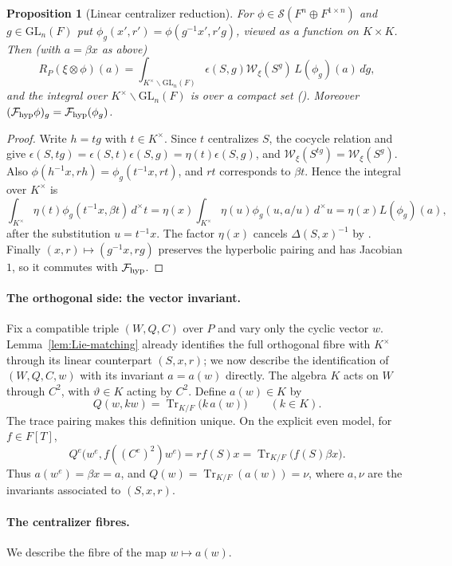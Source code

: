 \documentclass[11pt,oneside,notitlepage]{book}
\numberwithin{equation}{section}
\theoremstyle{plain}
\newtheorem{proposition}[theorem]{Proposition}
\theoremstyle{definition}
\newcommand{\GL}{\mathrm{GL}}
\newcommand{\cS}{\mathcal{S}}
\newcommand{\cW}{\mathcal{W}}
\newcommand{\Tr}{\operatorname{Tr}}
\begin{document}
\begin{proposition}[Linear centralizer reduction]\label{prop:even-lin}
For $\phi\in\cS(F^n\oplus F^{1\times n})$ and $g\in\GL_n(F)$ put $\phi_g(x',r')=\phi(g^{-1}x',r'g)$, viewed as a function on $K\times K$. Then (with $a=\beta x$ as above)
\[R_P(\xi\otimes\phi)(a)=\int_{K^\times\backslash\GL_n(F)}\epsilon(S,g)\cW_\xi(S^g)\,L(\phi_g)(a)\,d\dot g,\]
and the integral over $K^\times\backslash\GL_n(F)$ is over a compact set (). Moreover $(\mathcal F_{\rm hyp}\phi)_g=\mathcal F_{\rm hyp}(\phi_g)$.
\end{proposition}
\begin{proof}
Write $h=tg$ with $t\in K^\times$. Since $t$ centralizes $S$, the cocycle relation and  give $\epsilon(S,tg)=\epsilon(S,t)\epsilon(S,g)=\eta(t)\epsilon(S,g)$, and $\cW_\xi(S^{tg})=\cW_\xi(S^g)$. Also $\phi(h^{-1}x,rh)=\phi_g(t^{-1}x,rt)$, and $rt$ corresponds to $\beta t$. Hence the integral over $K^\times$ is
\[\int_{K^\times}\eta(t)\phi_g(t^{-1}x,\beta t)\,d^\times t=\eta(x)\int_{K^\times}\eta(u)\phi_g(u,a/u)\,d^\times u=\eta(x)L(\phi_g)(a),\]
after the substitution $u=t^{-1}x$. The factor $\eta(x)$ cancels $\Delta(S,x)^{-1}$ by . Finally $(x,r)\mapsto(g^{-1}x,rg)$ preserves the hyperbolic pairing and has Jacobian $1$, so it commutes with $\mathcal F_{\rm hyp}$.
\end{proof}

\paragraph{The orthogonal side: the vector invariant.}
Fix a compatible triple $(W,Q,C)$ over $P$ and vary only the cyclic vector $w$. Lemma~\ref{lem:Lie-matching} already identifies the full orthogonal fibre with $K^\times$ through its linear counterpart $(S,x,r)$; we now describe the identification of $(W,Q,C,w)$ with its invariant $a=a(w)$ directly.
The algebra $K$ acts on $W$ through $C^2$, with $\vartheta\in K$ acting by $C^2$. Define $a(w)\in K$ by
\[
Q(w,kw)=\Tr_{K/F}\bigl(k\,a(w)\bigr)\qquad(k\in K).
\]
The trace pairing makes this definition unique. On the explicit even model, for $f\in F[T]$,
\[
Q^e\bigl(w^e,f((C^e)^2)w^e\bigr)
=r f(S)x=\Tr_{K/F}\bigl(f(S)\beta x\bigr).
\]
Thus $a(w^e)=\beta x=a$, and $Q(w)=\Tr_{K/F}(a(w))=\nu$, where $a,\nu$ are the invariants associated to $(S,x,r)$.

\paragraph{The centralizer fibres.} We describe the fibre of the map $w\mapsto a(w)$.
\end{document}
